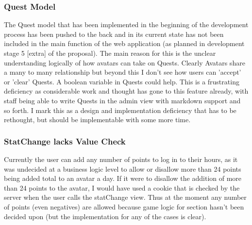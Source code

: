 \documentclass[11pt,a4paper]{article}
\begin{document}
\subsubsection{Quest Model}
The Quest model that has been implemented in the beginning of the development process has been pushed to the back and in its current state has not been included in the main function of the web application (as planned in development stage 5 [extra] of the proposal). The main reason for this is the unclear understanding logically of how avatars can take on Quests. Clearly Avatars share a many to many relationship but beyond this I don't see how users can 'accept' or 'clear' Quests. A boolean variable in Quests could help. This is a frustrating deficiency as considerable work and thought has gone to this feature already, with staff being able to write Quests in the admin view with markdown support and so forth. I mark this as a design and implementation deficiency that has to be rethought, but should be implementable with some more time.

\subsubsection{StatChange lacks Value Check}
Currently the user can add any number of points to log in to their hours, as it was undecided at a business logic level to allow or disallow more than 24 points being added total to an avatar a day. If it were to disallow the addition of more than 24 points to the avatar, I would have used a cookie that is checked by the server when the user calls the statChange view. Thus at the moment any number of points (even negatives) are allowed because game logic for section hasn't been decided upon (but the implementation for any of the cases is clear).
\end{document}
